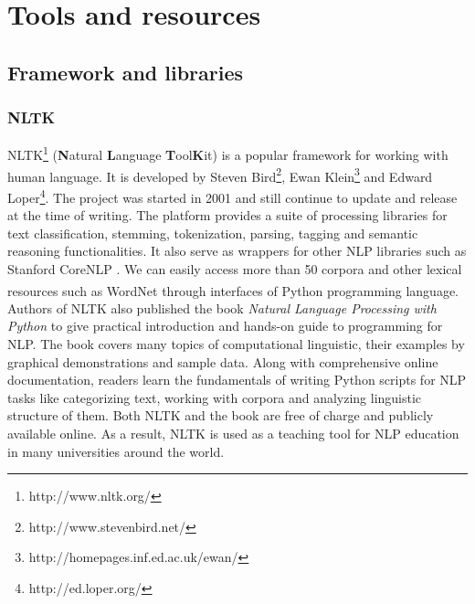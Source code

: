 
\chapter{Tools and resources}
	\label{chapter:empire-strikes-back}%



\section{Framework and libraries}
\subsection{NLTK}
NLTK\footnote{http://www.nltk.org/} (\textbf{N}atural \textbf{L}anguage \textbf{T}ool\textbf{K}it) is a popular framework for working with human language. It is developed by Steven Bird\footnote{http://www.stevenbird.net/}, Ewan Klein\footnote{http://homepages.inf.ed.ac.uk/ewan/} and Edward Loper\footnote{http://ed.loper.org/}. The project was started in 2001 and still continue to update and release at the time of writing. The platform provides a suite of processing libraries for text classification, stemming, tokenization, parsing, tagging and semantic reasoning functionalities. It also serve as wrappers for other NLP libraries such as Stanford CoreNLP \cite{manning-EtAl:2014:P14-5}. We can easily access more than 50 corpora and other lexical resources such as WordNet\textsuperscript{\textregistered} through interfaces of Python programming language.\\
Authors of NLTK also published the book \textit{Natural Language Processing with Python} \cite{Bird2009} to give practical introduction and hands-on guide to programming for NLP. The book covers many topics of computational linguistic, their examples by graphical demonstrations and sample data. Along with comprehensive online documentation, readers learn the fundamentals of writing Python scripts for NLP tasks like categorizing text, working with corpora and analyzing linguistic structure of them. Both NLTK and the book are free of charge and publicly available online. As a result, NLTK is used as a teaching tool for NLP education in many universities around the world.\\

